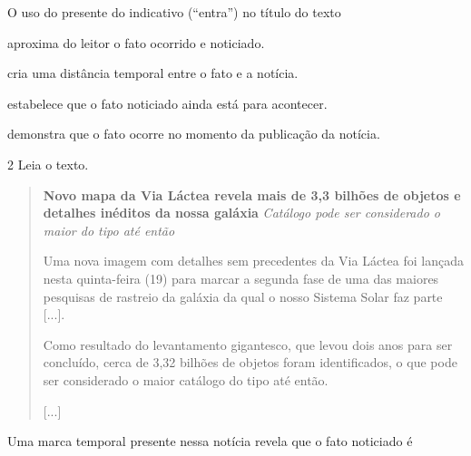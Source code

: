 O uso do presente do indicativo (“entra”) no título do texto

\begin{escolha}
\item aproxima do leitor o fato ocorrido e noticiado.

\item cria uma distância temporal entre o fato e a notícia.

\item estabelece que o fato noticiado ainda está para acontecer.

\item demonstra que o fato ocorre no momento da publicação da notícia.
\end{escolha}




\num{2} Leia o texto.

\begin{quote}
\textbf{Novo mapa da Via Láctea revela mais de 3,3 bilhões de objetos e
detalhes inéditos da nossa galáxia}
\textit{Catálogo pode ser considerado o maior do tipo até então}

Uma nova imagem com detalhes sem precedentes da Via Láctea foi lançada
nesta quinta-feira (19) para marcar a segunda fase de uma das maiores
pesquisas de rastreio da galáxia da qual o nosso Sistema Solar faz parte
{[}...{]}.

Como resultado do levantamento gigantesco, que levou dois anos para ser
concluído, cerca de 3,32 bilhões de objetos foram identificados, o que
pode ser considerado o maior catálogo do tipo até então.

{[}...{]}

\end{quote}

Uma marca temporal presente nessa notícia revela que o fato noticiado é

